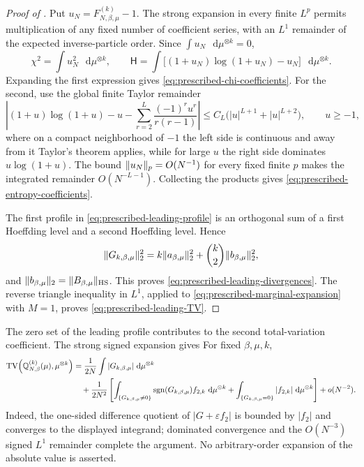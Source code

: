 \documentclass[11pt,reqno]{amsart}
\numberwithin{equation}{section}
\theoremstyle{plain}
\theoremstyle{definition}
\DeclarePairedDelimiter{\norm}{\lVert}{\rVert}
\newcommand{\dd}{\mathop{}\!\mathrm d}
\newcommand{\Q}{\mathbb Q}
\newcommand{\TV}{\operatorname{TV}}
\DeclareMathOperator{\sgn}{sgn}
\newcommand{\HS}{\mathrm{HS}}
\newcommand{\be}{\beta}
\newcommand{\Hr}{\mathsf H}
\begin{document}
\begin{proof}[Proof of ]
Put $u_N=F_{N,\be,\mu}^{(k)}-1$.  The strong expansion in every finite $L^p$ permits multiplication of any fixed number of coefficient series, with an $L^1$ remainder of the expected inverse-particle order.  Since $\int u_N\,\dd\mu^{\otimes k}=0$,
\begin{equation}
 \chi^2=\int u_N^2\,\dd\mu^{\otimes k},
 \qquad
 \Hr=\int\bigl[(1+u_N)\log(1+u_N)-u_N\bigr]\,\dd\mu^{\otimes k}.
 \label{eq:prescribed-divergence-identities}
\end{equation}
Expanding the first expression gives \eqref{eq:prescribed-chi-coefficients}.  For the second, use the global finite Taylor remainder
\begin{equation}
 \left|(1+u)\log(1+u)-u
 -\sum_{r=2}^{L}\frac{(-1)^ru^r}{r(r-1)}\right|
 \leq C_L\bigl(|u|^{L+1}+|u|^{L+2}\bigr),
 \qquad u\geq-1,
 \label{eq:prescribed-entropy-global-remainder}
\end{equation}
where on a compact neighborhood of $-1$ the left side is continuous and away from it Taylor's theorem applies, while for large $u$ the right side dominates $u\log(1+u)$.  The bound $\norm{u_N}_{p}=O(N^{-1})$ for every fixed finite $p$ makes the integrated remainder $O(N^{-L-1})$.  Collecting the products gives \eqref{eq:prescribed-entropy-coefficients}.

The first profile in \eqref{eq:prescribed-leading-profile} is an orthogonal sum of a first Hoeffding level and a second Hoeffding level.  Hence
\begin{equation}
 \norm{G_{k,\be,\mu}}_2^2
 =k\norm{a_{\be,\mu}}_2^2
 +\binom{k}{2}\norm{b_{\be,\mu}}_2^2,
 \label{eq:prescribed-profile-orthogonality}
\end{equation}
and $\norm{b_{\be,\mu}}_2=\norm{B_{\be,\mu}}_{\HS}$.  This proves \eqref{eq:prescribed-leading-divergences}.  The reverse triangle inequality in $L^1$, applied to \eqref{eq:prescribed-marginal-expansion} with $M=1$, proves \eqref{eq:prescribed-leading-TV}.
\end{proof}

The zero set of the leading profile contributes to the second total-variation coefficient. The strong signed expansion gives  For fixed $\be,\mu,k$,
\begin{align}
 \TV\!\left(\Q_{N,\be}^{(k)}(\mu),\mu^{\otimes k}\right)
 &=\frac1{2N}\int|G_{k,\be,\mu}|\,\dd\mu^{\otimes k}
 \notag\\
 &\quad+\frac1{2N^2}\left[
 \int_{\{G_{k,\be,\mu}\neq0\}}\sgn(G_{k,\be,\mu})f_{2,k}\,\dd\mu^{\otimes k}
 +\int_{\{G_{k,\be,\mu}=0\}}|f_{2,k}|\,\dd\mu^{\otimes k}
 \right]
 +o(N^{-2}).
 \label{eq:prescribed-second-TV-coefficient}
\end{align}
Indeed, the one-sided difference quotient of $|G+\varepsilon f_2|$ is bounded by $|f_2|$ and converges to the displayed integrand; dominated convergence and the $O(N^{-3})$ signed $L^1$ remainder complete the argument.  No arbitrary-order expansion of the absolute value is asserted.
\end{document}
